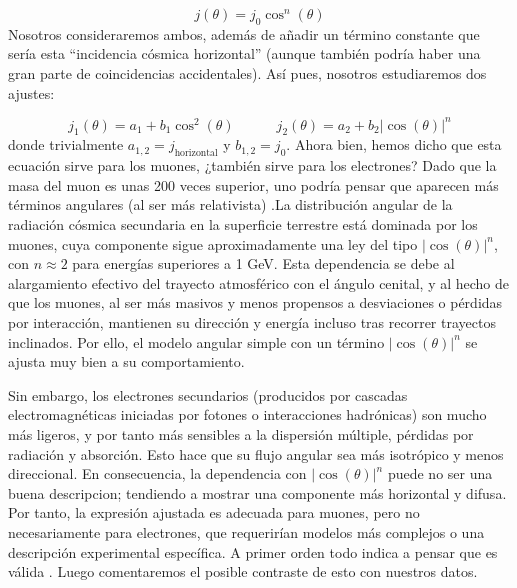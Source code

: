 \documentclass[11pt]{article}
\newcommand{\tquad}{\quad \quad \quad}
\begin{document}
\begin{equation}
	j (\theta) = j_0 \cos^n (\theta)	
\end{equation}
Nosotros consideraremos ambos, además de añadir un término constante que sería esta ``incidencia  cósmica horizontal'' (aunque también podría haber una gran parte de coincidencias accidentales). Así pues, nosotros estudiaremos dos ajustes:

\begin{equation}
	j_1 (\theta) = a_1 + b_1 \cos^2(\theta)	 \tquad 
	j_2 (\theta) = a_2 + b_2 |\cos(\theta)|^n
\end{equation}
donde trivialmente $a_{1,2}=j_{\text{horizontal}}$ y $b_{1,2}=j_0$. Ahora bien, hemos dicho que esta ecuación sirve para los muones, ¿también sirve para los electrones? Dado que la masa del muon es unas 200 veces superior, uno podría pensar que aparecen más términos angulares (al ser más relativista) .La distribución angular de la radiación cósmica secundaria en la superficie terrestre está dominada por los muones, cuya componente sigue aproximadamente una ley del tipo $|\cos(\theta)|^n$, con $n \approx 2$ para energías superiores a 1 GeV. Esta dependencia se debe al alargamiento efectivo del trayecto atmosférico con el ángulo cenital, y al hecho de que los muones, al ser más masivos y menos propensos a desviaciones o pérdidas por interacción, mantienen su dirección y energía incluso tras recorrer trayectos inclinados. Por ello, el modelo angular simple con un término $|\cos(\theta)|^n$ se ajusta muy bien a su comportamiento.

Sin embargo, los electrones secundarios (producidos por cascadas electromagnéticas iniciadas por fotones o interacciones hadrónicas) son mucho más ligeros, y por tanto más sensibles a la dispersión múltiple, pérdidas por radiación y absorción. Esto hace que su flujo angular sea más isotrópico y menos direccional. En consecuencia, la dependencia con $|\cos(\theta)|^n$ puede no ser una buena descripcion; tendiendo a mostrar una componente más horizontal y difusa. Por tanto, la expresión ajustada es adecuada para muones, pero no necesariamente para electrones, que requerirían modelos más complejos o una descripción experimental específica. A primer orden todo indica a pensar que es válida \cite{P2}. Luego comentaremos el posible contraste de esto con nuestros datos. 


\end{document}
